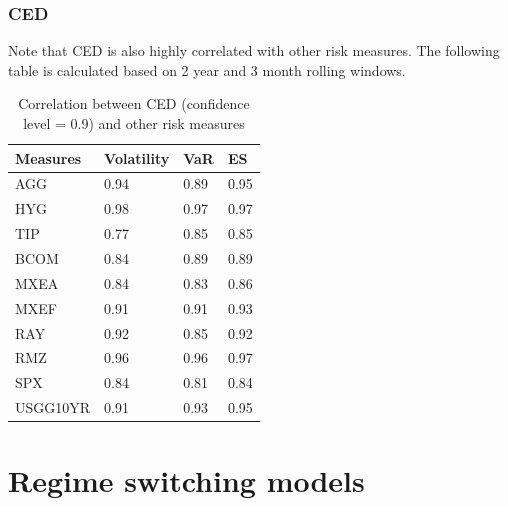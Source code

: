 \documentclass{beamer}
\newcommand\Fontviii{\fontsize{8}{9.2}\selectfont}
\begin{document}
\begin{frame}
\frametitle{CED}
\Fontviii

Note that CED is also highly correlated with other risk measures. The following table is calculated based on 2 year and 3 month rolling windows.

\begin{table}[!h]
\centering 
\begin{tabular}{ p{2cm}||p{2cm}|p{2cm}|p{2cm}} 
\hline
Measures & Volatility & VaR & ES\\
  \hline
AGG & 0.94 & 0.89 & 0.95\\ 
HYG & 0.98 & 0.97 & 0.97\\ 
TIP & 0.77 & 0.85 & 0.85\\ 
BCOM & 0.84 & 0.89 & 0.89\\ 
MXEA & 0.84 & 0.83 & 0.86\\ 
MXEF & 0.91 & 0.91 & 0.93\\ 
RAY & 0.92 & 0.85 & 0.92\\ 
RMZ & 0.96 & 0.96 & 0.97\\ 
SPX & 0.84 & 0.81 & 0.84\\ 
USGG10YR & 0.91 & 0.93 & 0.95\\
\hline
\end{tabular}
\label{table:corrRiskMeasureCED}
\caption{Correlation between CED (confidence level = 0.9) and other risk measures}
\end{table}

\end{frame}

\section{Regime switching models}
\end{document}
